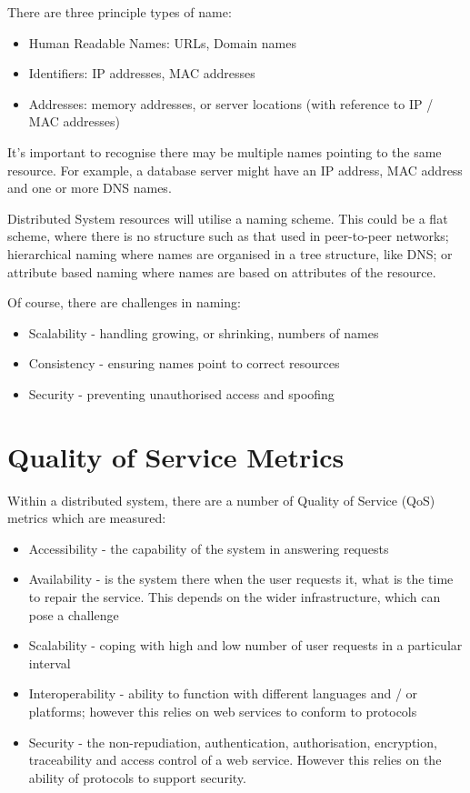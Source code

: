 There are three principle types of name:
\begin{itemize}
    \item Human Readable Names: URLs, Domain names
    \item Identifiers: IP addresses, MAC addresses
    \item Addresses: memory addresses, or server locations (with reference to IP / MAC addresses)
\end{itemize}

It's important to recognise there may be multiple names pointing to the same resource. For example, a database server might have an IP address, MAC address and one or more DNS names.

Distributed System resources will utilise a naming scheme. This could be a flat scheme, where there is no structure such as that used in peer-to-peer networks; hierarchical naming where names are organised in a tree structure, like DNS; or attribute based naming where names are based on attributes of the resource.

Of course, there are challenges in naming:
\begin{itemize}
    \item Scalability - handling growing, or shrinking, numbers of names
    \item Consistency - ensuring names point to correct resources
    \item Security - preventing unauthorised access and spoofing
\end{itemize}

\section{Quality of Service Metrics}
Within a distributed system, there are a number of Quality of Service (QoS) metrics which are measured:
\begin{itemize}
    \item Accessibility - the capability of the system in answering requests 
    \item Availability - is the system there when the user requests it, what is the time to repair the service. This depends on the wider infrastructure, which can pose a challenge
    \item Scalability - coping with high and low number of user requests in a particular interval 
    \item Interoperability - ability to function with different languages and / or platforms; however this relies on web services to conform to protocols
    \item Security - the non-repudiation, authentication, authorisation, encryption, traceability and access control of a web service. However this relies on the ability of protocols to support security.
\end{itemize}
